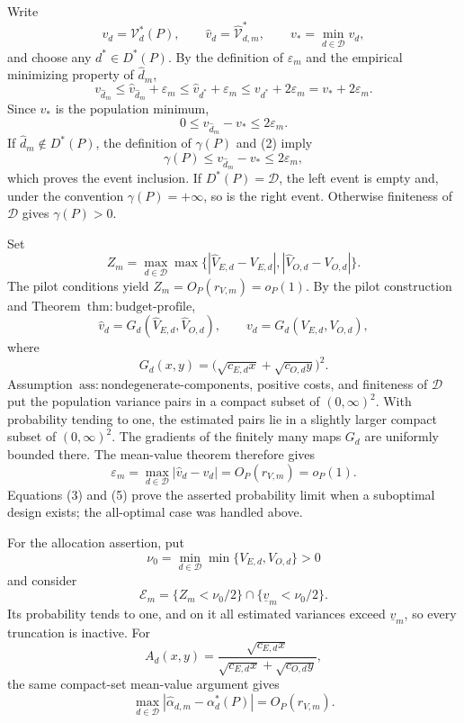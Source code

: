 Write
\[
 v_d=\mathcal V_d^*(P),\qquad
 \widehat v_d=\widehat{\mathcal V}_{d,m}^*,
 \qquad v_*=\min_{d\in\mathcal D}v_d,
\]
and choose any \(d^*\in D^*(P)\).  By the definition of \(\varepsilon_m\) and the empirical minimizing property of \(\widehat d_m\),
\[
 v_{\widehat d_m}
 \le \widehat v_{\widehat d_m}+\varepsilon_m
 \le \widehat v_{d^*}+\varepsilon_m
 \le v_{d^*}+2\varepsilon_m
 =v_*+2\varepsilon_m.                                             \tag{1}
\]
Since \(v_*\) is the population minimum,
\[
 0\le v_{\widehat d_m}-v_*\le2\varepsilon_m.                     \tag{2}
\]
If \(\widehat d_m\notin D^*(P)\), the definition of \(\gamma(P)\) and (2) imply
\[
 \gamma(P)\le v_{\widehat d_m}-v_*\le2\varepsilon_m,             \tag{3}
\]
which proves the event inclusion.  If \(D^*(P)=\mathcal D\), the left event is empty and, under the convention \(\gamma(P)=+\infty\), so is the right event.  Otherwise finiteness of \(\mathcal D\) gives \(\gamma(P)>0\).

Set
\[
 Z_m=\max_{d\in\mathcal D}\max\bigl\{
 |\widehat V_{E,d}-V_{E,d}|,
 |\widehat V_{O,d}-V_{O,d}|\bigr\}.
\]
The pilot conditions yield \(Z_m=O_P(r_{V,m})=o_P(1)\).  By the pilot construction and Theorem~\(\mathrm{thm{:}budget\text{-}profile}\),
\[
 \widehat v_d=G_d(\widehat V_{E,d},\widehat V_{O,d}),
 \qquad
 v_d=G_d(V_{E,d},V_{O,d}),                                        \tag{4}
\]
where
\[
 G_d(x,y)=\bigl(\sqrt{c_{E,d}x}+\sqrt{c_{O,d}y}\bigr)^2.
\]
Assumption~\(\mathrm{ass{:}nondegenerate\text{-}components}\), positive costs, and finiteness of \(\mathcal D\) put the population variance pairs in a compact subset of \((0,\infty)^2\).  With probability tending to one, the estimated pairs lie in a slightly larger compact subset of \((0,\infty)^2\).  The gradients of the finitely many maps \(G_d\) are uniformly bounded there.  The mean-value theorem therefore gives
\[
 \varepsilon_m
 =\max_{d\in\mathcal D}|\widehat v_d-v_d|
 =O_P(r_{V,m})=o_P(1).                                             \tag{5}
\]
Equations (3) and (5) prove the asserted probability limit when a suboptimal design exists; the all-optimal case was handled above.

For the allocation assertion, put
\[
 \nu_0=\min_{d\in\mathcal D}\min\{V_{E,d},V_{O,d}\}>0
\]
and consider
\[
 \mathcal E_m
 =\{Z_m<\nu_0/2\}\cap\{\underline v_m<\nu_0/2\}.             \tag{6}
\]
Its probability tends to one, and on it all estimated variances exceed \(\underline v_m\), so every truncation is inactive.  For
\[
 A_d(x,y)=
 \frac{\sqrt{c_{E,d}x}}
 {\sqrt{c_{E,d}x}+\sqrt{c_{O,d}y}},
\]
the same compact-set mean-value argument gives
\[
 \max_{d\in\mathcal D}
 |\widehat\alpha_{d,m}-\alpha_d^*(P)|=O_P(r_{V,m}).                \tag{7}
\]

